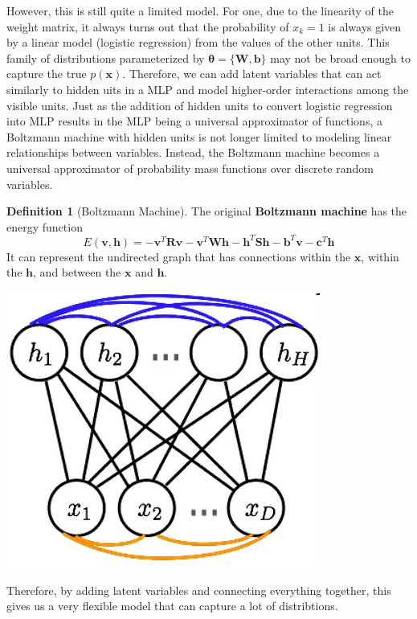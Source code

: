 \documentclass{article}
\theoremstyle{definition}
\theoremstyle{remark}
\theoremstyle{definition}
\newtheorem{definition}{Definition}[section]
\begin{document}
    However, this is still quite a limited model. For one, due to the linearity of the weight matrix, it always turns out that the probability of $x_k = 1$ is always given by a linear model (logistic regression) from the values of the other units. This family of distributions parameterized by $\boldsymbol{\theta} = \{\mathbf{W}, \mathbf{b}\}$ may not be broad enough to capture the true $p(\mathbf{x})$. Therefore, we can add latent variables that can act similarly to hidden uits in a MLP and model higher-order interactions among the visible units. Just as the addition of hidden units to convert logistic regression into MLP results in the MLP being a universal approximator of functions, a Boltzmann machine with hidden units is not longer limited to modeling linear relationships between variables. Instead, the Boltzmann machine becomes a universal approximator of probability mass functions over discrete random variables. 

    \begin{definition}[Boltzmann Machine]
      The original \textbf{Boltzmann machine} has the energy function 
        \[E(\mathbf{v}, \mathbf{h}) = - \mathbf{v}^T \mathbf{R} \mathbf{v} - \mathbf{v}^T \mathbf{W} \mathbf{h} - \mathbf{h}^T \mathbf{S} \mathbf{h} - \mathbf{b}^T \mathbf{v} - \mathbf{c}^T \mathbf{h} \]
      It can represent the undirected graph that has connections within the $\mathbf{x}$, within the $\mathbf{h}$, and between the $\mathbf{x}$ and $\mathbf{h}$.
      \begin{center} 
        \includegraphics[scale=0.4]{img/Boltzmann_lateral.png}
      \end{center}
      Therefore, by adding latent variables and connecting everything together, this gives us a very flexible model that can capture a lot of distribtions.
    \end{definition} 
\end{document}
